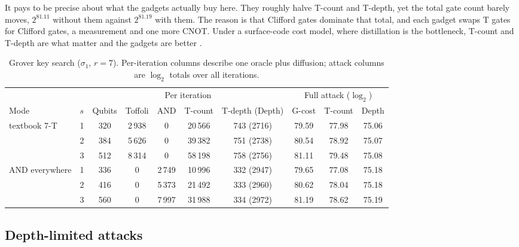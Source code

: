 \documentclass[runningheads,10pt]{llncs}
\begin{document}
It pays to be precise about what the gadgets actually buy here. They roughly halve T-count and T-depth, yet the total gate count barely moves, $2^{81.11}$ without them against $2^{81.19}$ with them. The reason is that Clifford gates dominate that total, and each gadget swaps T gates for Clifford gates, a measurement and one more CNOT. Under a surface-code cost model, where distillation is the bottleneck, T-count and T-depth are what matter and the gadgets are better . 

\begin{table}[htbp]
\centering
\caption{Grover key search ($\sigma_1$, $r=7$). Per-iteration columns describe one oracle plus diffusion; attack columns are $\log_2$ totals over all iterations.}
\label{tab:grover-cost}
\small
\begin{tabular}{llccccc|ccc}
\toprule
& & \multicolumn{5}{c|}{Per iteration} & \multicolumn{3}{c}{Full attack ($\log_2$)} \\
Mode & $s$ & Qubits & Toffoli & AND & T-count & T-depth (Depth) & G-cost & T-count & Depth \\
\midrule
\multirow{3}{*}{textbook 7-T}
 & 1 & 320 & 2\,938 & 0 & 20\,566 & 743 (2716) & 79.59 & 77.98 & 75.06 \\
 & 2 & 384 & 5\,626 & 0 & 39\,382 & 751 (2738) & 80.54 & 78.92 & 75.07 \\
 & 3 & 512 & 8\,314 & 0 & 58\,198 & 758 (2756) & 81.11 & 79.48 & 75.08 \\
\midrule
\multirow{3}{*}{AND everywhere}
 & 1 & 336 & 0 & 2\,749 & 10\,996 & 332 (2947) & 79.65 & 77.08 & 75.18 \\
 & 2 & 416 & 0 & 5\,373 & 21\,492 & 333 (2960) & 80.62 & 78.04 & 75.18 \\
 & 3 & 560 & 0 & 7\,997 & 31\,988 & 334 (2972) & 81.19 & 78.62 & 75.19 \\
\bottomrule
\end{tabular}
\end{table}

\subsection{Depth-limited attacks}
\end{document}

